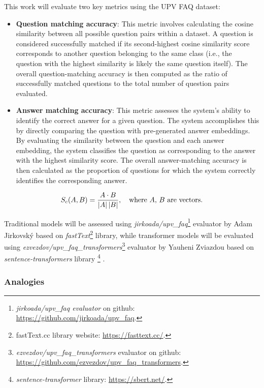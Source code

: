 This work will evaluate two key metrics using the UPV FAQ dataset:
\begin{itemize}
  \item \textbf{Question matching accuracy}:
 This metric involves calculating the cosine similarity  between all possible question pairs within a dataset.
 A question is considered successfully matched if its second-highest cosine similarity score corresponds to another question belonging to the same class (i.e., the question with the highest similarity is likely the same question itself). 
 The overall question-matching accuracy is then computed as the ratio of successfully matched questions to the total number of question pairs evaluated.  
  \item \textbf{Answer matching accuracy}:
 This metric assesses the system's ability to identify the correct answer for a given question.
 The system accomplishes this by directly comparing the question with pre-generated answer embeddings.
 By evaluating the similarity  between the question and each answer embedding, the system classifies the question as corresponding to the answer with the highest similarity score.
 The overall answer-matching accuracy is then calculated as the proportion of questions for which the system correctly identifies the corresponding answer.  
\end{itemize}

\begin{equation}
 S_c(A,B) = {{A \cdot B} \over {\left\lvert A\right\rvert \left\lvert B\right\rvert}}, \quad \text{where $A$, $B$ are vectors.}
  \label{eq:cosine_similarity}
\end{equation}

Traditional models will be assessed using \textit{jirkoada/upv\_faq}\footnote{\textit{jirkoada/upv\_faq evaluator} on github: \url{https://github.com/jirkoada/upv_faq}.}
evaluator by Adam Jirkovský based on \textit{fastText}\footnote{\label{footnote:fasttex_lib}fastText.cc library website: \url{https://fasttext.cc/}.} library,
while transformer models will be evaluated using \textit{ezvezdov/upv\_faq\_transformers}\footnote{\textit{ezvezdov/upv\_faq\_transformers} evaluator on github: \url{https://github.com/ezvezdov/upv_faq_transformers}.}
evaluator by Yauheni Zviazdou based on \textit{sentence-transformers} library \footnote{\label{footnote:SentenceTransformers}\textit{sentence-transformer} library: \url{https://sbert.net/}.} \cite{reimers2019sentencebert}.


\subsubsection{Analogies}

